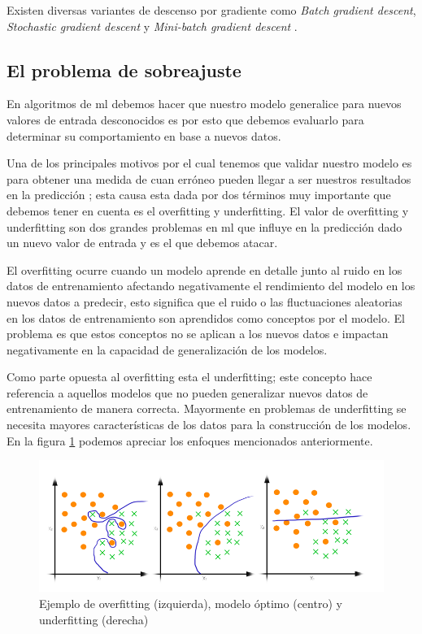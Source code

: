 Existen diversas variantes de descenso por gradiente como \textit{Batch gradient descent}, \textit{Stochastic gradient descent} y \textit{Mini-batch gradient descent} \citep{variants_gd}.

\subsection{El problema de sobreajuste}\label{sub:validacion-modelo}

En algoritmos de \ac{ml} debemos hacer que nuestro modelo generalice para nuevos valores de entrada desconocidos es por esto que debemos evaluarlo para determinar su comportamiento en base a nuevos datos. 

Una de los principales motivos por el cual tenemos que validar nuestro modelo es para obtener una medida de cuan erróneo pueden llegar a ser nuestros resultados en la predicción ; esta causa esta dada por dos términos muy importante que debemos tener en cuenta es el  overfitting y underfitting. El valor de overfitting y underfitting son dos grandes problemas en \ac{ml} que influye en la predicción dado un nuevo valor de entrada y es el que debemos atacar. 

El overfitting ocurre cuando un modelo aprende en detalle junto al ruido en los datos de entrenamiento afectando negativamente el rendimiento del modelo en los nuevos datos a predecir, esto significa que el ruido o las fluctuaciones aleatorias en los datos de entrenamiento son aprendidos como conceptos por el modelo. El problema es que estos conceptos no se aplican a los nuevos datos e impactan negativamente en la capacidad de generalización de los modelos.

Como parte opuesta al overfitting esta el  underfitting; este concepto hace referencia a aquellos modelos que no pueden generalizar nuevos datos de entrenamiento de manera correcta. Mayormente en problemas de underfitting se necesita mayores características de los datos para la construcción de los modelos. En la figura \ref{Fig: overUnder} podemos apreciar los enfoques mencionados anteriormente.

\begin{figure}[h]
 \centering
  \includegraphics[scale=0.4,keepaspectratio=true,clip=true]{imagenes/MarcoTeorico/OverFUnderF.png}
  \caption{Ejemplo de overfitting (izquierda), modelo óptimo (centro) y underfitting (derecha) }%
	\label{Fig: overUnder}
\end{figure}



